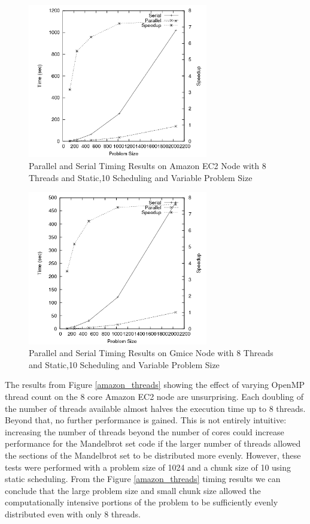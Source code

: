 \documentclass{article}
\begin{document}
\begin{figure}
\centering
\includegraphics[width=0.7\textwidth]{../data/amazon_n.png}
\caption{Parallel and Serial Timing Results on Amazon EC2 Node with 8 Threads and Static,10 Scheduling and Variable Problem Size}
\label{amazon_n}
\end{figure}

\begin{figure}
\centering
\includegraphics[width=0.7\textwidth]{../data/gmice_n.png}
\caption{Parallel and Serial Timing Results on Gmice Node with 8 Threads and Static,10 Scheduling and Variable Problem Size}
\label{gmice_n}
\end{figure}

The results from Figure \ref{amazon_threads} showing the effect of varying OpenMP thread count on the 8 core Amazon EC2 node are unsurprising. Each doubling of the number of threads available almost halves the execution time up to 8 threads. Beyond that, no further performance is gained. This is not entirely intuitive: increasing the number of threads beyond the number of cores could increase performance for the Mandelbrot set code if the larger number of threads allowed the sections of the Mandelbrot set to be distributed more evenly. However, these tests were performed with a problem size of 1024 and a chunk size of 10 using static scheduling. From the Figure \ref{amazon_threads} timing results we can conclude that the large problem size and small chunk size allowed the computationally intensive portions of the problem to be sufficiently evenly distributed even with only 8 threads.
\end{document}
